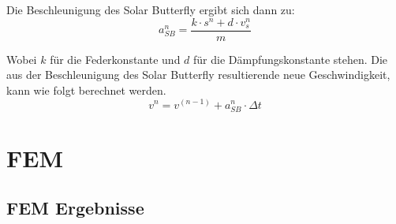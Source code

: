   Die Beschleunigung des Solar Butterfly ergibt sich dann zu:\\
  \begin{equation}
    a_{SB}^n = \frac{k \cdot s^n + d \cdot v_s^n}{m}
  \end{equation}

  Wobei $k$ für die Federkonstante und $d$ für die Dämpfungskonstante stehen.
  Die aus der Beschleunigung des Solar Butterfly resultierende neue Geschwindigkeit, kann wie folgt berechnet werden.
  \begin{equation}
    v^n = v^{(n-1)} + a_{SB}^n \cdot \Delta t
  \end{equation}



\section{FEM}

\subsection{FEM Ergebnisse}
  \label{FEM Ergebnisse}

